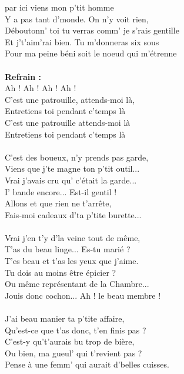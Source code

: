 
 par ici viens mon p'tit homme
\\Y a pas tant d'monde. On n'y voit rien,
\\Déboutonn' toi tu verras comm' je s'rais gentille
\\Et j't'aim'rai bien. Tu m'donneras six sous
\\Pour ma peine béni soit le noeud qui m'étrenne
\\\\\textbf{Refrain :}
\\Ah ! Ah ! Ah ! Ah !
\\C'est une patrouille, attends-moi là,
\\Entretiens toi pendant c'temps là
\\C'est une patrouille attends-moi là
\\Entretiens toi pendant c'temps là
\\\\C'est des boueux, n'y prends pas garde,
\\Viens que j'te magne ton p'tit outil...
\\Vrai j'avais cru qu' c'était la garde...
\\I' bande encore... Est-il gentil !
\\Allons et que rien ne t'arrête,
\\Fais-moi cadeaux d'ta p'tite burette...
\\\\Vrai j'en t'y d'la veine tout de même,
\\T'as du beau linge... Es-tu marié ?
\\T'es beau et t'as les yeux que j'aime.
\\Tu dois au moins être épicier ?
\\Ou même représentant de la Chambre...
\\Jouis donc cochon... Ah ! le beau membre !
\\\\J'ai beau manier ta p'tite affaire,
\\Qu'est-ce que t'as donc, t'en finis pas ?
\\C'est-y qu't'aurais bu trop de bière,
\\Ou bien, ma gueul' qui t'revient pas ?
\\Pense à une femm' qui aurait d'belles cuisses.
